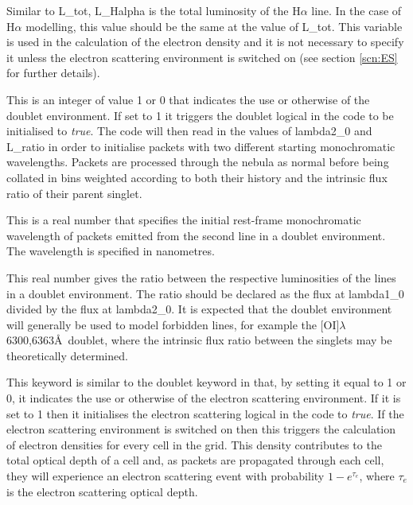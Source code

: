 
Similar to L\_tot, L\_Halpha is the total luminosity of the H${\alpha}$ line.  In the case of H${\alpha}$ modelling, this value should be the same at the value of L\_tot.  This variable is used in the calculation of the electron density and it is not necessary to specify it unless the electron scattering environment is switched on (see section \ref{scn:ES} for further details).  


This is an integer of value 1 or 0 that indicates the use or otherwise of the doublet environment.  If set to 1 it triggers the doublet logical in the code to be initialised to \textit{true}.  The code will then read in the values of {lambda2\_0} and {L\_ratio} in order to initialise packets with two different starting monochromatic wavelengths.  Packets are processed through the nebula as normal before being collated in bins weighted according to both their history and the intrinsic flux ratio of their parent singlet.


This is a real number that specifies the initial rest-frame monochromatic wavelength of packets emitted from the second line in a doublet environment.  The wavelength is specified in nanometres.


This real number gives the ratio between the respective luminosities of the lines in a doublet environment.  The ratio should be declared as the flux at lambda1\_0 divided by the flux at lambda2\_0.  It is expected that the doublet environment will generally be used to model forbidden lines, for example the [OI]$\lambda$6300,6363\AA\ doublet, where the intrinsic flux ratio between the singlets may be theoretically determined.

\vspace{0.8cm}


This keyword is similar to the doublet keyword in that, by setting it equal to 1 or 0, it indicates the use or otherwise of the electron scattering environment.  If it is set to 1 then it initialises the electron scattering logical in the code to \textit{true}.  If the electron scattering environment is switched on then this triggers the calculation of electron densities for every cell in the grid.  This density contributes to the total optical depth of a cell and, as packets are propagated through each cell, they will experience an electron scattering event with probability $1-e^{\tau_e}$, where $\tau_e$ is the electron scattering optical depth.


